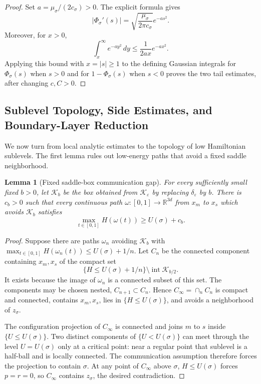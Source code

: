 \documentclass[11pt]{article}
\numberwithin{equation}{section}
\theoremstyle{plain}
\newtheorem{lemma}[theorem]{Lemma}
\theoremstyle{definition}
\theoremstyle{remark}
\newcommand{\R}{\mathbb R}
\newcommand{\eps}{\varepsilon}
\begin{document}
\begin{proof}
Set $a=\mu_\sigma/(2c_\sigma)>0$.  The explicit formula gives
\[
|\Phi_\sigma'(s)|
=\sqrt{\frac{\mu_\sigma}{2\pi c_\sigma}}e^{-as^2}.
\]
Moreover, for $x>0$,
\[
\int_x^\infty e^{-ay^2}\,dy
\le\frac{1}{2ax}e^{-ax^2}.
\]
Applying this bound with $x=|s|\ge1$ to the defining Gaussian integrals for
$\Phi_\sigma(s)$ when $s>0$ and for $1-\Phi_\sigma(s)$ when $s<0$ proves the
two tail estimates, after changing $c,C>0$.
\end{proof}

\subsection{Sublevel Topology, Side Estimates, and Boundary-Layer Reduction}


We now turn from local analytic estimates to the topology of low
Hamiltonian sublevels.  The first lemma rules out low-energy paths that avoid
a fixed saddle neighborhood.

\begin{lemma}[Fixed saddle-box communication gap]
\label{lem:fixed-box-communication-gap}
For every sufficiently small fixed $b>0$, let $\mathcal K_b$ be the
box obtained from $\mathcal K_\eps$ by replacing $\delta_\eps$ by $b$.
There is $c_b>0$ such that every continuous path
$\omega:[0,1]\to\R^{3d}$ from $x_m$ to $x_s$ which avoids
$\mathcal K_b$ satisfies
{
\[
\max_{t\in[0,1]}H(\omega(t))\ge U(\sigma)+c_b .
\]}
\end{lemma}

\begin{proof}
Suppose there are paths $\omega_n$ avoiding $\mathcal K_b$ with
$\max_{t\in[0,1]}H(\omega_n(t))\le U(\sigma)+1/n$.
Let $C_n$ be the connected component
containing $x_m,x_s$ of the compact set
\[
\{H\le U(\sigma)+1/n\}\setminus\operatorname{int}\mathcal K_{b/2}.
\]
It exists because the image of $\omega_n$ is a connected subset of this set.
The components may be chosen nested, $C_{n+1}\subset C_n$.  Hence
$C_\infty=\cap_nC_n$ is compact and connected, contains $x_m,x_s$, lies in
$\{H\le U(\sigma)\}$, and avoids a neighborhood of $z_\sigma$.

The configuration projection of $C_\infty$ is connected and joins $m$ to
$s$ inside $\{U\le U(\sigma)\}$.  Two distinct components of
$\{U<U(\sigma)\}$ can meet through the level $U=U(\sigma)$ only at a critical
point: near a regular point that sublevel is a half-ball and is locally
connected.  The communication assumption therefore forces the projection to
contain $\sigma$.  At any point of $C_\infty$ above $\sigma$,
$H\le U(\sigma)$ forces $p=r=0$, so $C_\infty$ contains $z_\sigma$, the desired
contradiction.
\end{proof}
\end{document}
